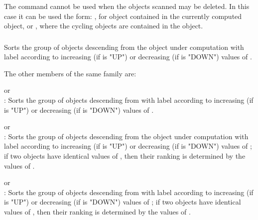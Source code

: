 \documentclass [11pt,a4paper] {book}
\begin{document}
The command  cannot be used when the objects scanned may be deleted. In this case it can be used the form: , for object contained in the currently computed object, or , where the cycling objects  are contained in the  object.



\subsubsection{}

Sorts the group of objects descending from the object under computation with label
 according to increasing (if  is "UP") or decreasing (if
 is "DOWN") values of .

The other members of the same family are:

\begin{list}{-}{\itemsep -0.2cm}
\item {} or \\
: Sorts the group of objects descending from  with label  according to increasing (if  is "UP") or decreasing (if  is "DOWN") values of .

\item {} or \\
: Sorts the group of objects descending from the object under computation with label  according to increasing (if  is "UP") or decreasing (if  is "DOWN") values of ; if two objects have identical
values of , then their ranking is determined by the values of .

\item {} or \\
: Sorts the group of objects descending from  with label  according to increasing (if  is "UP") or decreasing (if  is "DOWN") values of ; if two objects have identical values of , then their ranking is determined by the values of .
\end{list}
\end{document}

